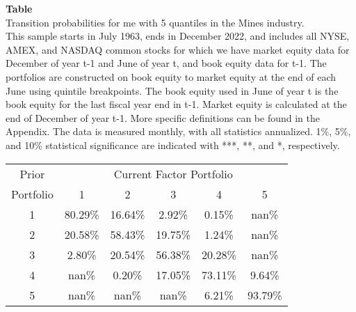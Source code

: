 \begin{table*}[ht!]
\raggedright
{}
\label{tab: transition_probs_me_Mines_with_5_quantiles}
\textbf{Table \thetable} \\
Transition probabilities for me with 5 quantiles in the Mines industry. \\
\hspace*{1em}This sample starts in July 1963, ends in December 2022, and includes all NYSE, AMEX, and NASDAQ common stocks for which we have market equity data for December of year t-1 and June of year t, and book equity data for t-1. The portfolios are constructed on book equity to market equity at the end of each June using quintile breakpoints.  The book equity used in June of year t is the book equity for the last fiscal year end in t-1.  Market equity is calculated at the end of December of year t-1.  More specific definitions can be found in the Appendix.  The data is measured monthly, with all statistics annualized.  1\%, 5\%, and 10\% statistical significance are indicated with ***, **, and *, respectively. \\
\vspace{0.5em}
\centering
\begin{adjustbox}{max width=\textwidth}
\begin{tabular}{@{}cccccc@{}}
\toprule
Prior & \multicolumn{5}{c}{Current Factor Portfolio} \\
Portfolio & 1 & 2 & 3 & 4 & 5 \\
\midrule
1 & 80.29\% & 16.64\% & 2.92\% & 0.15\% & nan\% \\
2 & 20.58\% & 58.43\% & 19.75\% & 1.24\% & nan\% \\
3 & 2.80\% & 20.54\% & 56.38\% & 20.28\% & nan\% \\
4 & nan\% & 0.20\% & 17.05\% & 73.11\% & 9.64\% \\
5 & nan\% & nan\% & nan\% & 6.21\% & 93.79\% \\
\bottomrule
\end{tabular}
\end{adjustbox}
\end{table*}